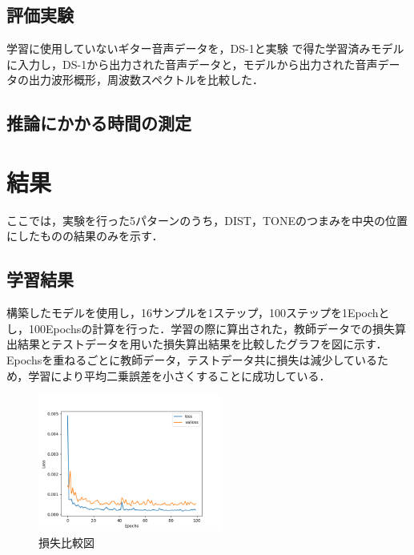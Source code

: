 \documentclass{jarticle}
\begin{document}

\subsection{評価実験}
学習に使用していないギター音声データを，DS-1と実験 で得た学習済みモデルに入力し，DS-1から出力された音声データと，モデルから出力された音声データの出力波形概形，周波数スペクトルを比較した．

\subsection{推論にかかる時間の測定}

\section{結果}
ここでは，実験を行った5パターンのうち，DIST，TONEのつまみを中央の位置にしたものの結果のみを示す．

\subsection{学習結果}
構築したモデルを使用し，16サンプルを1ステップ，100ステップを1Epochとし，100Epochsの計算を行った．学習の際に算出された，教師データでの損失算出結果とテストデータを用いた損失算出結果を比較したグラフを図に示す．
Epochsを重ねるごとに教師データ，テストデータ共に損失は減少しているため，学習により平均二乗誤差を小さくすることに成功している．

\begin{figure}[htbp]
 \begin{center}
  \includegraphics[width=60mm]{gain5_loss_hikaku.png}
 \end{center}
 \caption{損失比較図}
 \label{fig:one}
\end{figure}
\end{document}
